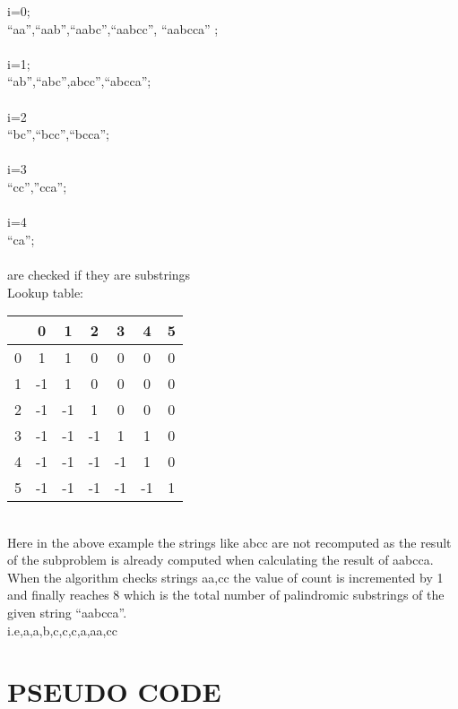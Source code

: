 \documentclass[twocolumn]{article}
\begin{document}
i=0;\\
“aa”,“aab”,“aabc”,“aabcc”, “aabcca” ;\\
\\
i=1;\\
“ab”,“abc”,abcc”,“abcca”;\\
\\
i=2\\
“bc”,“bcc”,“bcca”;\\
\\
i=3\\
“cc”,”cca”;\\
\\
i=4\\
“ca”;\\
\noindent\\
are checked if they are substrings \\

Lookup table:





\begin{center}
	\begin{tabular}{ |c | c | c | c | c | c | c| }
	\hline
	 &0&1&2&3&4&5\\
	 \hline
	0&1&1&0&0&0&0\\
	\hline
1&-1&1&0&0&0&0\\
\hline
2&-1&-1&1&0&0&0\\
\hline
3&-1&-1&-1&1&1&0\\
\hline
4&-1&-1&-1&-1&1&0\\
\hline
5&-1&-1&-1&-1&-1&1\\
	\hline
	\end{tabular}
\end{center}



\noindent\\
Here in the above example the strings like abcc are not recomputed as the result of the subproblem is already computed when calculating the result of aabcca.\\
When the algorithm checks strings aa,cc the value of count is incremented by 1 and finally reaches 8 which is the total number of palindromic substrings of the given string “aabcca”.\\
i.e,a,a,b,c,c,c,a,aa,cc\\
\section{   PSEUDO CODE
}
\end{document}
